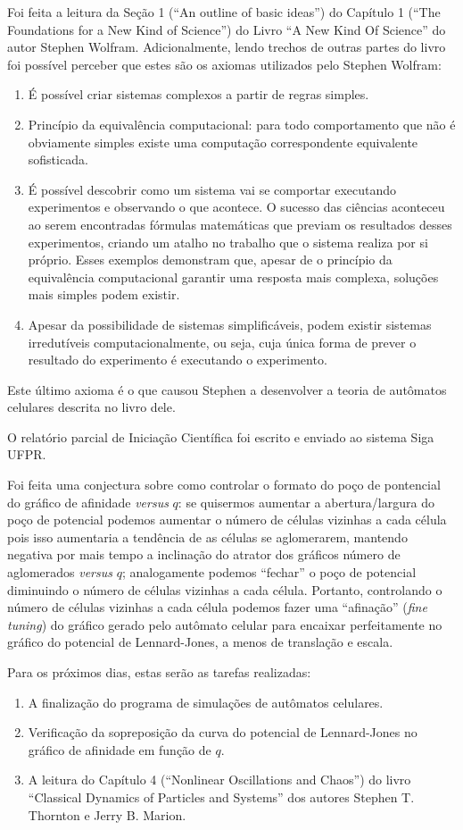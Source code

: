 \documentclass[12pt,a4paper,final]{article}
\begin{document}
  Foi feita a leitura da Seção 1 (``An outline of basic ideas'') do Capítulo 1 (``The Foundations for a New Kind of Science'') do Livro ``A New Kind Of Science'' do autor Stephen Wolfram. Adicionalmente, lendo trechos de outras partes do livro foi possível perceber que estes são os axiomas utilizados pelo Stephen Wolfram:
  \begin{enumerate}
    \item É possível criar sistemas complexos a partir de regras simples.
    \item Princípio da equivalência computacional: para todo comportamento que não é obviamente simples  existe uma computação correspondente equivalente sofisticada.
    \item É possível descobrir como um sistema vai se comportar executando experimentos e observando o que acontece. O sucesso das ciências aconteceu ao serem encontradas fórmulas matemáticas que previam os resultados desses experimentos, criando um atalho no trabalho que o sistema realiza por si próprio. Esses exemplos demonstram que, apesar de o princípio da equivalência computacional garantir uma resposta mais complexa, soluções mais simples podem existir.
    \item Apesar da possibilidade de sistemas simplificáveis, podem existir sistemas irredutíveis computacionalmente, ou seja, cuja única forma de prever o resultado do experimento é executando o experimento.
  \end{enumerate}
  Este último axioma é o que causou Stephen a desenvolver a teoria de autômatos celulares descrita no livro dele.

  O relatório parcial de Iniciação Científica foi escrito e enviado ao sistema Siga UFPR.

  Foi feita uma conjectura sobre como controlar o formato do poço de pontencial do gráfico de afinidade \textit{versus} $q$: se quisermos aumentar a abertura/largura do poço de potencial podemos aumentar o número de células vizinhas a cada célula pois isso aumentaria a tendência de as células se aglomerarem, mantendo negativa por mais tempo a inclinação do atrator dos gráficos número de aglomerados \textit{versus} $q$; analogamente podemos ``fechar'' o poço de potencial diminuindo o número de células vizinhas a cada célula. Portanto, controlando o número de células vizinhas a cada célula podemos fazer uma ``afinação'' (\textit{fine tuning}) do gráfico gerado pelo autômato celular para encaixar perfeitamente no gráfico do potencial de Lennard-Jones, a menos de translação e escala.

  Para os próximos dias, estas serão as tarefas realizadas:
	\begin{enumerate}
		\item A finalização do programa de simulações de autômatos celulares.
		\item Verificação da sopreposição da curva do potencial de Lennard-Jones no gráfico de afinidade em função de $q$.
		\item A leitura do Capítulo 4 (``Nonlinear Oscillations and Chaos'') do livro ``Classical Dynamics of Particles and Systems'' dos autores Stephen T. Thornton e Jerry B. Marion.
	\end{enumerate}
\end{document}
